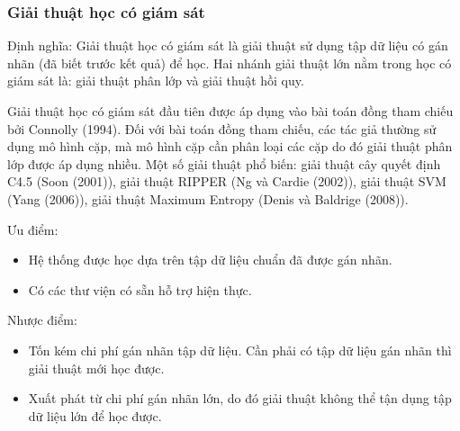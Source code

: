 \documentclass[12pt]{extarticle}
\begin{document}
				\subsubsection*{Giải thuật học có giám sát}
					\par Định nghĩa: Giải thuật học có giám sát là giải thuật sử dụng tập dữ liệu có gán nhãn (đã biết trước kết quả) để học. Hai nhánh giải thuật lớn nằm trong học có giám sát là: giải thuật phân lớp và giải thuật hồi quy.
					\par Giải thuật học có giám sát đầu tiên được áp dụng vào bài toán đồng tham chiếu bởi Connolly (1994)\cite{connolly95}. Đối với bài toán đồng tham chiếu, các tác giả thường sử dụng mô hình cặp, mà mô hình cặp cần phân loại các cặp do đó giải thuật phân lớp được áp dụng nhiều. Một số giải thuật phổ biến: giải thuật cây quyết định C4.5 (Soon (2001)\cite{soon01}), giải thuật RIPPER (Ng và Cardie (2002)\cite{ng02}), giải thuật SVM (Yang (2006)\cite{yang06}), giải thuật Maximum Entropy (Denis và Baldrige (2008)\cite{denis08}).
					\par Ưu điểm:
					\begin{itemize}
						\item{Hệ thống được học dựa trên tập dữ liệu chuẩn đã được gán nhãn.}
						\item{Có các thư viện có sẵn hỗ trợ hiện thực.}
					\end{itemize}
					\par Nhược điểm:
					\begin{itemize}
						\item{Tốn kém chi phí gán nhãn tập dữ liệu. Cần phải có tập dữ liệu gán nhãn thì giải thuật mới học được.}
						\item{Xuất phát từ chi phí gán nhãn lớn, do đó giải thuật không thể tận dụng tập dữ liệu lớn để học được.}
					\end{itemize}
\end{document}
